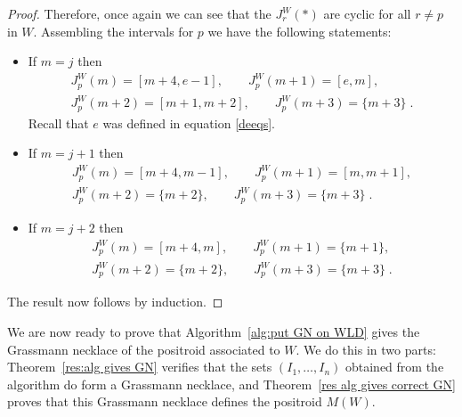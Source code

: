 \documentclass[11pt]{article}
\theoremstyle{remark}
\theoremstyle{definition}
\begin{document}
\begin{proof}
Therefore, once again we can see that the $J_r^{W}(*)$ are cyclic for all $r\neq p$ in $W$.  Assembling the intervals for $p$ we have the following statements:
\begin{itemize}
\item If $m=j$ then
\begin{gather*}J_p^{W}(m) = [m+4,e-1], \qquad  J_p^{W}(m+1) = [e,m], \\  J_p^{W}(m+2) = [m+1,m+2], \qquad  J_p^{W}(m+3) = \{m+3\}\;.\end{gather*}
Recall that $e$ was defined in equation \eqref{deeqs}.
\item If $m=j+1$ then
\begin{gather*}J_p^{W}(m) = [m+4,m-1], \qquad J_p^{W}(m+1) = [m,m+1], \\  J_p^{W}(m+2) = \{m+2\}, \qquad  J_p^{W}(m+3) = \{m+3\}\;.\end{gather*}
\item If $m=j+2$ then
\begin{gather*}J_p^{W}(m) = [m+4,m], \qquad  J_p^{W}(m+1) = \{m+1\}, \\  J_p^{W}(m+2) = \{m+2\}, \qquad  J_p^{W}(m+3) = \{m+3\}\;.\end{gather*}
\end{itemize}
The result now follows by induction.
\end{proof}
\endgroup %


We are now ready to prove that Algorithm~\ref{alg:put GN on WLD} gives the Grassmann necklace of the positroid associated to $W$. We do this in two parts: Theorem~\ref{res:alg gives GN} verifies that the sets $(I_1,\dots,I_n)$ obtained from the algorithm do form a Grassmann necklace, and Theorem~\ref{res alg gives correct GN} proves that this Grassmann necklace defines the positroid $M(W)$.
\end{document}
